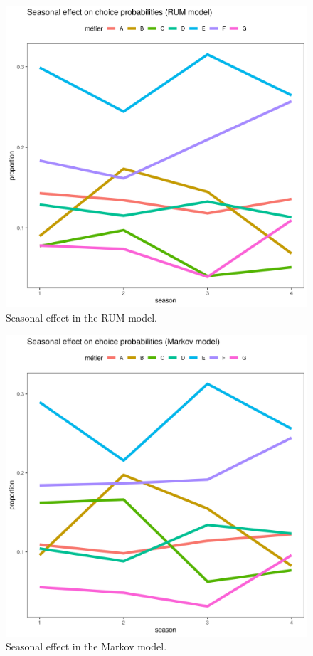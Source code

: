 \documentclass[12pt, halfline, a4paper]{ouparticle}
\begin{document}
\begin{figure}[!ht]
	\centering
	\includegraphics[width=1\linewidth]{figures/RUM_metier_seasonal_effect}
	\caption{Seasonal effect in the RUM model.} 
	\label{fig:RUM_Seas}
\end{figure}	

\begin{figure}[!ht]
	\centering
	\includegraphics[width=1\linewidth]{figures/Markov_metier_seasonal_effect}
	\caption{Seasonal effect in the Markov model.} 
	\label{fig:Markov_Seas}
\end{figure}	




\end{document}
